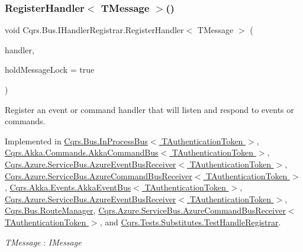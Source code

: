 \subsubsection{\texorpdfstring{Register\+Handler$<$ T\+Message $>$()}{RegisterHandler< TMessage >()}\hspace{0.1cm}{\footnotesize\ttfamily [2/2]}}
{\footnotesize\ttfamily void Cqrs.\+Bus.\+I\+Handler\+Registrar.\+Register\+Handler$<$ T\+Message $>$ (\begin{DoxyParamCaption}\item[{Action$<$ T\+Message $>$}]{handler,  }\item[{bool}]{hold\+Message\+Lock = {\ttfamily true} }\end{DoxyParamCaption})}



Register an event or command handler that will listen and respond to events or commands. 



Implemented in \hyperlink{classCqrs_1_1Bus_1_1InProcessBus_a62171e3c6d155cfdfd921b07b4909adf_a62171e3c6d155cfdfd921b07b4909adf}{Cqrs.\+Bus.\+In\+Process\+Bus$<$ T\+Authentication\+Token $>$}, \hyperlink{classCqrs_1_1Akka_1_1Commands_1_1AkkaCommandBus_adc21072d2b02c745747c4d585a53dba3_adc21072d2b02c745747c4d585a53dba3}{Cqrs.\+Akka.\+Commands.\+Akka\+Command\+Bus$<$ T\+Authentication\+Token $>$}, \hyperlink{classCqrs_1_1Azure_1_1ServiceBus_1_1AzureEventBusReceiver_a0c4ab01eece7025add9aa9ab4d23111d_a0c4ab01eece7025add9aa9ab4d23111d}{Cqrs.\+Azure.\+Service\+Bus.\+Azure\+Event\+Bus\+Receiver$<$ T\+Authentication\+Token $>$}, \hyperlink{classCqrs_1_1Azure_1_1ServiceBus_1_1AzureCommandBusReceiver_a1c9aba2692f51b66921802333433e2f7_a1c9aba2692f51b66921802333433e2f7}{Cqrs.\+Azure.\+Service\+Bus.\+Azure\+Command\+Bus\+Receiver$<$ T\+Authentication\+Token $>$}, \hyperlink{classCqrs_1_1Akka_1_1Events_1_1AkkaEventBus_a6795dfcaf611ce1b50310f442cef0546_a6795dfcaf611ce1b50310f442cef0546}{Cqrs.\+Akka.\+Events.\+Akka\+Event\+Bus$<$ T\+Authentication\+Token $>$}, \hyperlink{classCqrs_1_1Azure_1_1ServiceBus_1_1AzureEventBusReceiver_a0c4ab01eece7025add9aa9ab4d23111d_a0c4ab01eece7025add9aa9ab4d23111d}{Cqrs.\+Azure.\+Service\+Bus.\+Azure\+Event\+Bus\+Receiver$<$ T\+Authentication\+Token $>$}, \hyperlink{classCqrs_1_1Bus_1_1RouteManager_aeb620222dd0351a6d3848caf93e29954_aeb620222dd0351a6d3848caf93e29954}{Cqrs.\+Bus.\+Route\+Manager}, \hyperlink{classCqrs_1_1Azure_1_1ServiceBus_1_1AzureCommandBusReceiver_a1c9aba2692f51b66921802333433e2f7_a1c9aba2692f51b66921802333433e2f7}{Cqrs.\+Azure.\+Service\+Bus.\+Azure\+Command\+Bus\+Receiver$<$ T\+Authentication\+Token $>$}, and \hyperlink{classCqrs_1_1Tests_1_1Substitutes_1_1TestHandleRegistrar_a8eb57abc3420b0968c08c05204caa25c_a8eb57abc3420b0968c08c05204caa25c}{Cqrs.\+Tests.\+Substitutes.\+Test\+Handle\+Registrar}.

\begin{Desc}
\item[Type Constraints]\begin{description}
\item[{\em T\+Message} : {\em I\+Message}]\end{description}
\end{Desc}

